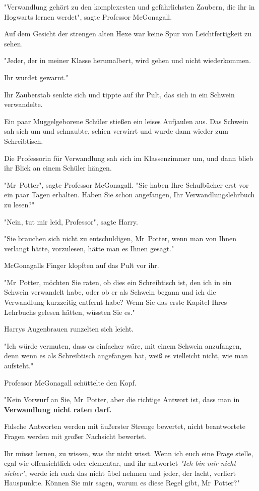 {"Verwandlung gehört zu den komplexesten und gefährlichsten Zaubern, die ihr in Hogwarts lernen werdet", sagte Professor McGonagall.

Auf dem Gesicht der strengen alten Hexe war keine Spur von Leichtfertigkeit zu sehen.

"Jeder, der in meiner Klasse herumalbert, wird gehen und nicht wiederkommen.

Ihr wurdet gewarnt."

Ihr Zauberstab senkte sich und tippte auf ihr Pult, das sich in ein Schwein verwandelte.

Ein paar Muggelgeborene Schüler stießen ein leises Aufjaulen aus. Das Schwein sah sich um und schnaubte, schien verwirrt und wurde dann wieder zum Schreibtisch.

Die Professorin für Verwandlung sah sich im Klassenzimmer um, und dann blieb ihr Blick an einem Schüler hängen.

"Mr~Potter", sagte Professor McGonagall. "Sie haben Ihre Schulbücher erst vor ein paar Tagen erhalten. Haben Sie schon angefangen, Ihr Verwandlungslehrbuch zu lesen?"

"Nein, tut mir leid, Professor", sagte Harry.

"Sie brauchen sich nicht zu entschuldigen, Mr~Potter, wenn man von Ihnen verlangt hätte, vorzulesen, hätte man es Ihnen gesagt."

McGonagalls Finger klopften auf das Pult vor ihr.

"Mr~Potter, möchten Sie raten, ob dies ein Schreibtisch ist, den ich in ein Schwein verwandelt habe, oder ob er als Schwein begann und ich die Verwandlung kurzzeitig entfernt habe? Wenn Sie das erste Kapitel Ihres Lehrbuchs gelesen hätten, wüssten Sie es."

Harrys Augenbrauen runzelten sich leicht.

"Ich würde vermuten, dass es einfacher wäre, mit einem Schwein anzufangen, denn wenn es als Schreibtisch angefangen hat, weiß es vielleicht nicht, wie man aufsteht."

Professor McGonagall schüttelte den Kopf.

"Kein Vorwurf an Sie, Mr~Potter, aber die richtige Antwort ist, dass man in \textbf{Verwandlung nicht raten darf.}

Falsche Antworten werden mit äußerster Strenge bewertet, nicht beantwortete Fragen werden mit großer Nachsicht bewertet.

Ihr müsst lernen, zu wissen, was ihr nicht wisst. Wenn ich euch eine Frage stelle, egal wie offensichtlich oder elementar, und ihr antwortet \emph{"Ich bin mir nicht sicher"}, werde ich euch das nicht übel nehmen und jeder, der lacht, verliert Hauspunkte. Können Sie mir sagen, warum es diese Regel gibt, Mr~Potter?"

}

